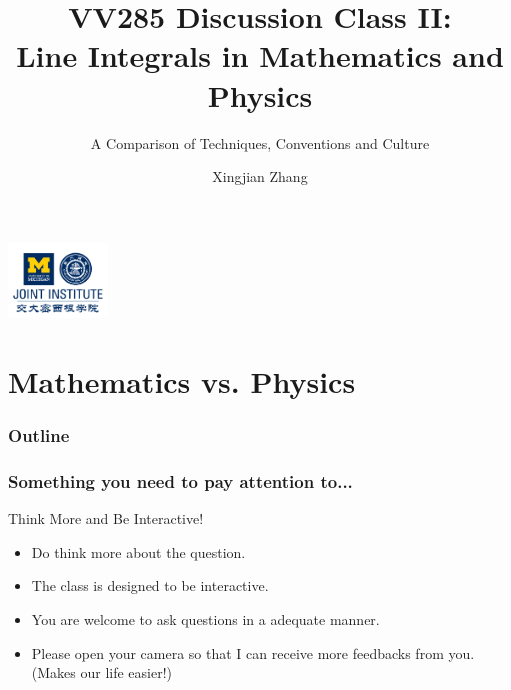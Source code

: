 \documentclass[11pt, t]{beamer}
\title{VV285 Discussion Class II:\\Line Integrals in Mathematics and Physics}
\subtitle{A Comparison of Techniques, Conventions and Culture}
\institute[UM-SJTU JI]{Univerity of Michigan-Shanghai Jiao Tong University Joint Institute}
\author{Xingjian Zhang}
\begin{document}
\begin{frame}
    \titlepage
    \begin{center}
        \includegraphics[height=2cm]{logo2.png}
    \end{center}
\end{frame}


\section{Mathematics vs. Physics}
\begin{frame}
    \frametitle{Outline}
    \begin{spacing}{1.5}
        \tableofcontents[currentsubsection,hideothersubsections,sectionstyle=hide]
    \end{spacing}
\end{frame}

\begin{frame}
    \frametitle{Something you need to pay attention to...}
    Think More and Be Interactive!
    \begin{itemize}
        \item Do think more about the question.
        \item The class is designed to be interactive.
        \item You are welcome to ask questions in a adequate manner.
        \item Please open your camera so that I can receive more feedbacks from you. (Makes our life easier!)
    \end{itemize}
\end{frame}
\end{document}
